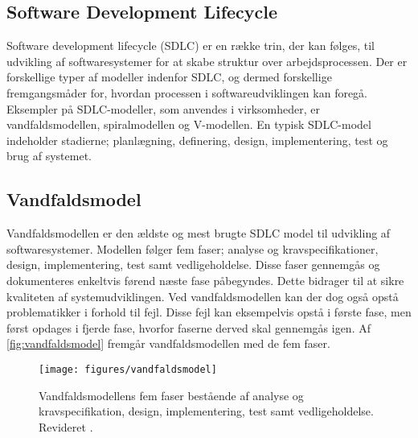 \subsection{Software Development Lifecycle}
Software development lifecycle (SDLC) er en række trin, der kan følges, til udvikling af softwaresystemer for at skabe struktur over arbejdsprocessen. Der er forskellige typer af modeller indenfor SDLC, og dermed forskellige fremgangsmåder for, hvordan processen i softwareudviklingen kan foregå. Eksempler på SDLC-modeller, som anvendes i virksomheder, er vandfaldsmodellen, spiralmodellen og V-modellen. En typisk SDLC-model indeholder stadierne; planlægning, definering, design, implementering, test og brug af systemet.\cite{Jain2011}

\subsection{Vandfaldsmodel}
Vandfaldsmodellen er den ældste og mest brugte SDLC model til udvikling af softwaresystemer. Modellen følger fem faser; analyse og kravspecifikationer, design, implementering, test samt vedligeholdelse. Disse faser gennemgås og dokumenteres enkeltvis førend næste fase påbegyndes. Dette bidrager til at sikre kvaliteten af systemudviklingen. Ved vandfaldsmodellen kan der dog også opstå problematikker i forhold til fejl. Disse fejl kan eksempelvis opstå i første fase, men først opdages i fjerde fase, hvorfor faserne derved skal gennemgås igen.\cite{Alshamrani2015,Bassil2012} Af \autoref{fig:vandfaldsmodel} fremgår vandfaldsmodellen med de fem faser. 

\begin{figure} [H]
\centering
\texttt{[image: figures/vandfaldsmodel]}
\caption{Vandfaldsmodellens fem faser bestående af analyse og kravspecifikation, design, implementering, test samt vedligeholdelse. Revideret \cite{Alshamrani2015,Bassil2012}.}
\label{fig:vandfaldsmodel}
\end{figure} 

